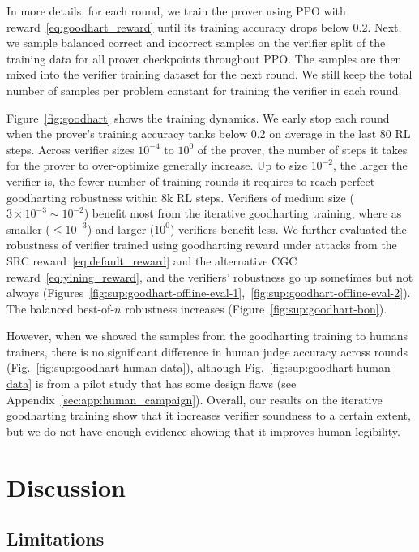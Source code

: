 \documentclass{article}
\begin{document}
In more details, for each round, we train the prover using PPO with reward~\eqref{eq:goodhart_reward} until its training accuracy drops below $0.2$. Next, we sample balanced correct and incorrect samples on the verifier split of the training data for all prover checkpoints throughout PPO. The samples are then mixed into the verifier training dataset for the next round. We still keep the total number of samples per problem constant for training the verifier in each round.

Figure~\ref{fig:goodhart} shows the training dynamics. We early stop each round when the prover's training accuracy tanks below 0.2 on average in the last 80 RL steps. Across verifier sizes $10^{-4}$ to $10^{0}$ of the prover, the number of steps it takes for the prover to over-optimize generally increase. Up to size $10^{-2}$, the larger the verifier is, the fewer number of training rounds it requires to reach perfect goodharting robustness within 8k RL steps. Verifiers of medium size ($3\times 10^{-3} \sim 10^{-2}$) benefit most from the iterative goodharting training, where as smaller ($\le 10^{-3}$) and larger ($10^0$) verifiers benefit less. We further evaluated the robustness of verifier trained using goodharting reward under attacks from the SRC reward~\eqref{eq:default_reward} and the alternative CGC reward~\eqref{eq:yining_reward}, and the verifiers' robustness go up sometimes but not always (Figures~\ref{fig:sup:goodhart-offline-eval-1},~\ref{fig:sup:goodhart-offline-eval-2}). The balanced best-of-$n$ robustness increases (Figure~\ref{fig:sup:goodhart-bon}).

However, when we showed the samples from the goodharting training to humans trainers, there is no significant difference in human judge accuracy across rounds (Fig.~\ref{fig:sup:goodhart-human-data}), although Fig.~\ref{fig:sup:goodhart-human-data} is from a pilot study that has some design flaws (see Appendix~\ref{sec:app:human_campaign}). Overall, our results on the iterative goodharting training show that it increases verifier soundness to a certain extent, but we do not have enough evidence showing that it improves human legibility.

\section{Discussion}


\subsection{Limitations}
\label{sec:limitations}
\end{document}
